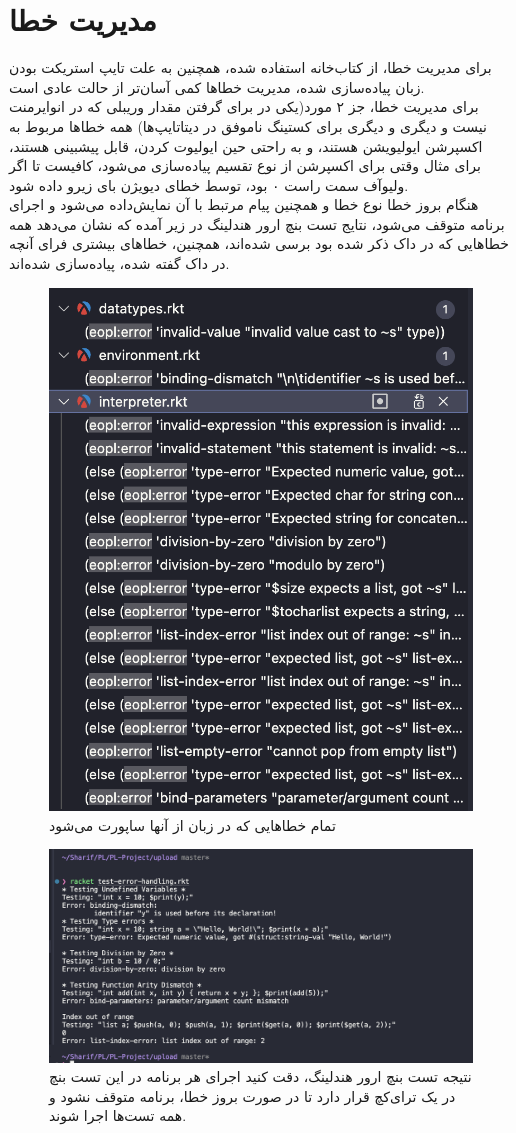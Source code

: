 \documentclass{article}
\begin{document}
\section{مدیریت خطا}
برای مدیریت خطا، از کتاب‌خانه 
استفاده شده، همچنین به علت تایپ استریکت بودن زبان پیاده‌سازی شده، مدیریت‌ خطا‌ها کمی آسان‌تر از حالت عادی‌ است.
\\
برای مدیریت خطا، جز ۲ مورد(یکی در برای گرفتن مقدار وریبلی که در انوایرمنت نیست و دیگری و دیگری برای کستینگ ناموفق در دیتاتایپ‌ها)
همه خطا‌ها مربوط به اکسپرشن ایولیویشن هستند، و به راحتی حین ایولیوت کردن، قابل پیشبینی هستند، برای مثال وقتی 
برای اکسپرشن از نوع تقسیم پیاده‌سازی می‌شود، کافیست تا اگر ولیو‌آف سمت راست ۰ بود، توسط 
خطای دیویژن بای زیرو داده شود.
\\
هنگام بروز خطا نوع خطا و همچنین پیام مرتبط با آن نمایش‌داده می‌شود و اجرای برنامه متوقف می‌شود، نتایج تست بنچ ارور هندلینگ در زیر آمده که نشان می‌دهد 
همه خطا‌هایی که در داک ذکر شده بود برسی شده‌اند، همچنین، خطا‌های بیشتری فرای آنچه در داک گفته شده، پیاده‌سازی شده‌اند.
\\
\begin{figure}[h]
        \centering
        \includegraphics[width=0.5\linewidth]{pics/eopl.png}
        \caption{تمام‌ خطا‌هایی که در زبان از آنها ساپورت می‌شود}
\end{figure}

\begin{figure}[h]
           \centering
        \includegraphics[width=1\linewidth]{pics/error-tb.png}
        \caption{نتیجه تست بنچ ارور هندلینگ، دقت کنید اجرای هر برنامه در این تست بنچ در یک ترای‌کچ قرار دارد تا در صورت بروز خطا، برنامه متوقف نشود و همه تست‌ها اجرا شوند.}     
\end{figure}
\FloatBarrier
\end{document}
